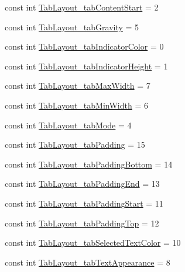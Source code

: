 \begin{CompactItemize}
\item 
const int \hyperlink{class__2doo_1_1_droid_1_1_resource_1_1_styleable_3b57b3e12c3eeb0fd9f03bcd195ae993}{TabLayout\_\-tabContentStart} = 2
\item 
const int \hyperlink{class__2doo_1_1_droid_1_1_resource_1_1_styleable_2c1154eb412de715c7248b33b40c1168}{TabLayout\_\-tabGravity} = 5
\item 
const int \hyperlink{class__2doo_1_1_droid_1_1_resource_1_1_styleable_202b5be3975289cbe32513ec1e29b870}{TabLayout\_\-tabIndicatorColor} = 0
\item 
const int \hyperlink{class__2doo_1_1_droid_1_1_resource_1_1_styleable_ca3eb700fd3c6576d89354f8f2d6384f}{TabLayout\_\-tabIndicatorHeight} = 1
\item 
const int \hyperlink{class__2doo_1_1_droid_1_1_resource_1_1_styleable_7bd7b59d75ebf922ea72a44950ee6351}{TabLayout\_\-tabMaxWidth} = 7
\item 
const int \hyperlink{class__2doo_1_1_droid_1_1_resource_1_1_styleable_706c1a824b7f1594171dbecc52225e86}{TabLayout\_\-tabMinWidth} = 6
\item 
const int \hyperlink{class__2doo_1_1_droid_1_1_resource_1_1_styleable_0db6caaca18c2ec46a01073bc9f4d952}{TabLayout\_\-tabMode} = 4
\item 
const int \hyperlink{class__2doo_1_1_droid_1_1_resource_1_1_styleable_06feff23c0952051d3b6d1f8534a93d1}{TabLayout\_\-tabPadding} = 15
\item 
const int \hyperlink{class__2doo_1_1_droid_1_1_resource_1_1_styleable_7291a58401a2e366945cccd15cbc1447}{TabLayout\_\-tabPaddingBottom} = 14
\item 
const int \hyperlink{class__2doo_1_1_droid_1_1_resource_1_1_styleable_11bba5cb225ea38f8ea278668cf8ffc8}{TabLayout\_\-tabPaddingEnd} = 13
\item 
const int \hyperlink{class__2doo_1_1_droid_1_1_resource_1_1_styleable_defdac646309781137e7c932ef64356a}{TabLayout\_\-tabPaddingStart} = 11
\item 
const int \hyperlink{class__2doo_1_1_droid_1_1_resource_1_1_styleable_b5fb596ef1bf01837204e687aa382ef2}{TabLayout\_\-tabPaddingTop} = 12
\item 
const int \hyperlink{class__2doo_1_1_droid_1_1_resource_1_1_styleable_d481d39e7ef1e9a2fceff3083f8514b4}{TabLayout\_\-tabSelectedTextColor} = 10
\item 
const int \hyperlink{class__2doo_1_1_droid_1_1_resource_1_1_styleable_8849ea076f334f7987d3e23d7f18b035}{TabLayout\_\-tabTextAppearance} = 8
\item 

\end{CompactItemize}
